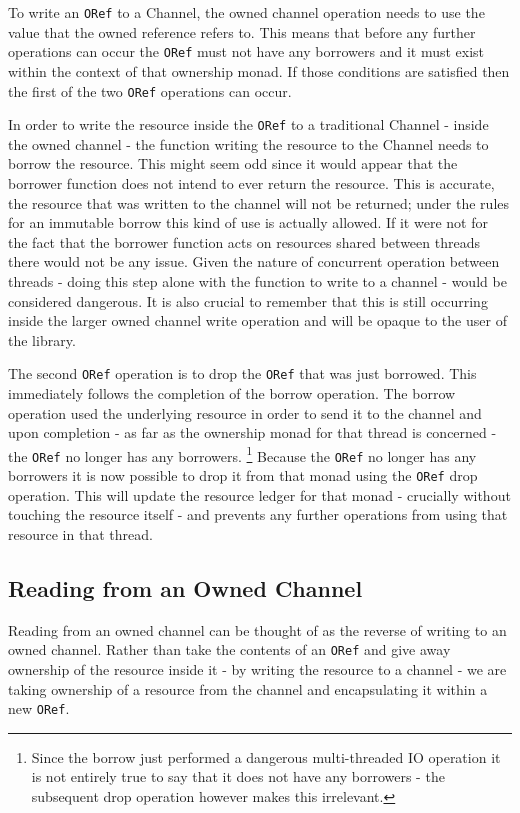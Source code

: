 \documentclass[onehalf,11pt]{beavtex}
\begin{document}
To write an \texttt{ORef} to a Channel, the owned channel operation
needs to use the value that the owned reference refers to.  This means
that before any further operations can occur the \texttt{ORef} must not have any
borrowers and it must exist within the context of that ownership monad.
If those conditions are satisfied then the first of the two \texttt{ORef}
operations can occur.

In order to write the resource inside the \texttt{ORef} to a traditional Channel
- inside the owned channel - the function writing the resource to the
Channel needs to borrow the resource.
This might seem odd since it would appear that the borrower function does not
intend to ever return the resource.  This is accurate, the resource that was
written to the channel will not be returned; under the rules for an immutable
borrow this kind of use is actually allowed.  If it were not for the fact that
the borrower function acts on resources shared between threads there would not be
any issue.  Given the nature of concurrent operation between threads - doing
this step alone with the function to write to a channel - would be considered
dangerous.  It is also crucial to remember that this is still occurring inside
the larger owned channel write operation and will be opaque to the user
of the library.

The second \texttt{ORef} operation is to drop the \texttt{ORef} that was just
borrowed. This immediately follows the completion of the borrow operation. The
borrow operation used the underlying resource in order to send it to the channel
and upon completion - as far as the ownership monad for that thread is
concerned - the \texttt{ORef} no longer has any borrowers.
\footnote{Since the borrow just performed a dangerous multi-threaded IO operation
  it is not entirely true to say that it does not have any borrowers - the
  subsequent drop operation however makes this irrelevant.}
Because the \texttt{ORef} no longer has any borrowers it is now possible to
drop it from that monad using the \texttt{ORef} drop operation.  This will
update the resource ledger for that monad - crucially without touching the
resource itself - and prevents any further operations from using that resource
in that thread.

\subsection{Reading from an Owned Channel}

Reading from an owned channel can be thought of as the reverse of
writing to an owned channel.  Rather than take the contents of an
\texttt{ORef} and give away ownership of the resource inside it - by writing the
resource to a channel - we are taking ownership of a resource from the channel
and encapsulating it within a new \texttt{ORef}.
\end{document}
